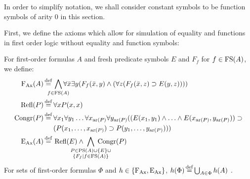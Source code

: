 In order to simplify notation, we shall consider constant symbols to be function symbols of arity $0$ in this section.

First, we define the axioms which allow for simulation of equality and functions in first order logic without equality and function symbols:

\begin{defi}
	For first-order formulas $A$ and fresh predicate symbols $E$ and $F_f$ for $f\in \operatorname{FS}(A)$, we define:\nopagebreak
	\begin{align*}
		\FAX(A) \defeq{}& \smashoperator{\bigwedge_{f \in \FS(A)}}  \forall \bar x \exists y (F_f(\bar x, y) \land (\forall z (F_f(\bar x, z) \limpl E(y, z)))) \\
		\Refl(P) \defeq{}& \forall x P(x,x)  \\ 
		\Congr(P) \defeq{}& 
\forall x_1 \forall y_1 \ldots \forall x_{\ar(P)} \forall y_{\ar(P)} 
(( E(x_1,y_1) \land \ldots \land E(x_{\ar(P)},  y_{\ar(P)})) \limpl  \\
 & (P(x_1, \ldots, x_{\ar(P)}) \limpl P(y_1, \ldots, y_{\ar(P)}) )) \\
		\EAX(A) \defeq{}& \Refl(E) \land \;\smashoperator{\bigwedge_{\substack{P \in\PS(A)\cup\{E\}\cup\\ \{F_f\mid f\in \FS(A)\}}}}\; \Congr(P)
\end{align*}
For sets of first-order formulas $\Phi$ and $h \in \{\operatorname{F_{Ax}}, \operatorname{E_{Ax}}\}$, $h(\Phi) \operatorname{\stackrel{\mathrm{def}}{=}} \bigcup_{A\in \Phi} h(A)$ .
\end{defi}

